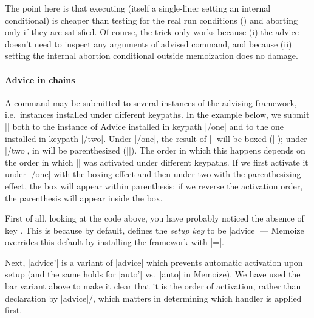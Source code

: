 \documentclass[a4paper,11pt]{article}
\begin{document}

The point here is that executing  (itself a single-liner
setting an internal conditional) is cheaper than testing for the real run
conditions () and aborting only if they are
satisfied.  Of course, the trick only works because (i) the advice doesn't
need to inspect any arguments of advised command, and because (ii) setting the
internal abortion conditional outside memoization does no damage.

\paragraph{Advice in chains}

A command may be submitted to several instances of the advising framework,
i.e.\ instances installed under different keypaths.  In the example below, we
submit |\foo| both to the instance of Advice installed in keypath |/one| and to
the one installed in keypath |/two|.  Under |/one|, the result of ||
will be boxed (|\fboxWrap|); under |/two|, in will be parenthesized
(|\parenWrap|).  The order in which this happens depends on the order in which
|\foo| was activated under different keypaths.  If we first activate it under
|/one| with the boxing effect and then under two with the parenthesizing
effect, the box will appear within parenthesis; if we reverse the activation
order, the parenthesis will appear inside the box.


First of all, looking at the code above, you have probably noticed the absence
of key .  This is because by default,  defines the \emph{setup key} to be |advice| --- Memoize overrides
this default by installing the framework with |=|.

Next, |advice'| is a variant of |advice| which prevents automatic activation
upon setup (and the same holds for |auto'| vs.\ |auto| in Memoize).  We have
used the bar variant above to make it clear that it is the order of activation,
rather than declaration by |advice|\slash {}, which matters in
determining which handler is applied first.
\end{document}
